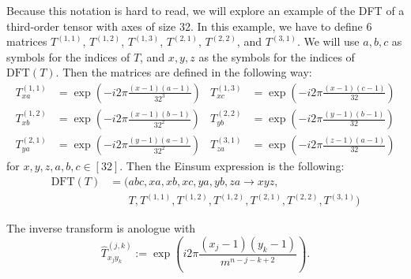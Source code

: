 Because this notation is hard to read, we will explore an example of the DFT of a third-order tensor with axes of size 32.
In this example, we have to define 6 matrices $T^{(1,1)}$, $T^{(1,2)}$, $T^{(1,3)}$, $T^{(2,1)}$, $T^{(2, 2)}$, and $T^{(3,1)}$.
We will use $a,b,c$ as symbols for the indices of $T$, and $x,y,z$ as the symbols for the indices of $\text{DFT}(T)$.
Then the matrices are defined in the following way:
\begin{align*}
    T^{(1,1)}_{xa} & = \exp\left(-i2\pi \frac{(x - 1)(a - 1)}{32^3}\right) & T^{(1,3)}_{xc} & = \exp\left(-i2\pi \frac{(x - 1)(c - 1)}{32}\right) \\
    T^{(1,2)}_{xb} & = \exp\left(-i2\pi \frac{(x - 1)(b - 1)}{32^2}\right) & T^{(2,2)}_{yb} & = \exp\left(-i2\pi \frac{(y - 1)(b - 1)}{32}\right) \\
    T^{(2,1)}_{ya} & = \exp\left(-i2\pi \frac{(y - 1)(a - 1)}{32^2}\right) & T^{(3,1)}_{za} & = \exp\left(-i2\pi \frac{(z - 1)(a - 1)}{32}\right)
\end{align*}
for $x, y, z, a, b, c \in [32]$.
Then the Einsum expression is the following:
\begin{align*}
    \text{DFT}(T) & = (abc, xa, xb, xc, ya, yb, za \rightarrow xyz,                                     \\
                  & \phantom{{}=(} T, T^{(1,1)}, T^{(1,2)}, T^{(1,2)}, T^{(2,1)}, T^{(2,2)}, T^{(3,1)})
\end{align*}

The inverse transform is anologue with
$$\hat{T}^{(j,k)}_{x_j y_k} := \exp\left(i2\pi \frac{(x_j - 1) (y_k - 1)}{m^{n - j - k + 2}}\right).$$
